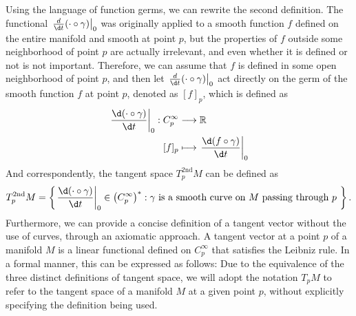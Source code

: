 \documentclass{report}
\begin{document}
Using the language of function germs, we can rewrite the second definition. The functional $\left.\frac{d}{\d t}(\cdot \circ \gamma)\right|_0$ was originally applied to a smooth function $f$ defined on the entire manifold and smooth at point $p$, but the properties of $f$ outside some neighborhood of point $p$ are actually irrelevant, and even whether it is defined or not is not important. Therefore, we can assume that $f$ is defined in some open neighborhood of point $p$, and then let $\left.\frac{d}{\d t}(\cdot \circ \gamma)\right|_0$ act directly on the germ of the smooth function $f$ at point $p$, denoted as $[f]_p$, which is defined as
\[
    \begin{aligned}
        \left.\frac{\d(\cdot \circ \gamma)}{\d t}\right|_0:C^\infty_p&\longrightarrow \mathbb{R}\\
        [f]_p&\longmapsto \left.\frac{\d(f \circ \gamma)}{\d t}\right|_0
    \end{aligned}
\]
And correspondently, the tangent space $T^{2\mathrm{nd}}_pM$ can be defined as
\[
    T^{2\mathrm{nd}}_pM=\left\{\left.\frac{\d(\cdot \circ \gamma)}{\d t}\right|_0\in \left(C^{\infty}_p\right)^*:\gamma\text{ is a smooth curve on $M$ passing through $p$ }\right\}.
\]
Furthermore, we can provide a concise definition of a tangent vector without the use of curves, through an axiomatic approach. A tangent vector at a point $p$ of a manifold $M$ is a linear functional defined on $C^\infty_p$ that satisfies the Leibniz rule. In a formal manner, this can be expressed as follows:
Due to the equivalence of the three distinct definitions of tangent space, we will adopt the notation $T_pM$ to refer to the tangent space of a manifold $M$ at a given point $p$, without explicitly specifying the definition being used.
\end{document}
